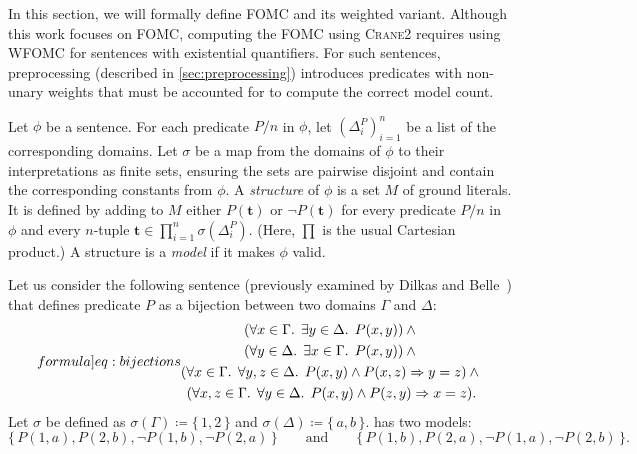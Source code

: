 \documentclass[a4paper,UKenglish,cleveref,autoref,table]{lipics-v2021}
\newcommand{\Cranetwo}{\textsc{Crane2}}
\begin{document}
In this section, we will formally define FOMC and its weighted variant. Although
this work focuses on FOMC, computing the FOMC using \Cranetwo{} requires using
WFOMC for sentences with existential quantifiers. For such sentences,
preprocessing (described in \cref{sec:preprocessing}) introduces predicates with
non-unary weights that must be accounted for to compute the correct model count.

\begin{definition}\label{def:model}
  Let $\phi$ be a sentence. For each predicate $P/n$ in $\phi$, let
  ${(\Delta_{i}^{P})}_{i=1}^{n}$ be a list of the corresponding domains. Let
  $\sigma$ be a map from the domains of $\phi$ to their interpretations as
  finite sets, ensuring the sets are pairwise disjoint and contain the
  corresponding constants from $\phi$. A \emph{structure} of $\phi$ is a set $M$
  of ground literals. It is defined by adding to $M$ either $P(\mathbf{t})$ or
  $\neg P(\mathbf{t})$ for every predicate $P/n$ in $\phi$ and every $n$-tuple
  $\mathbf{t} \in \prod_{i=1}^{n} \sigma(\Delta_{i}^{P})$. (Here, $\prod$ is the
  usual Cartesian product.) A structure is a \emph{model} if it makes $\phi$
  valid.
\end{definition}

\begin{example}\label{example:bijections}
  Let us consider the following sentence (previously examined by Dilkas and
  Belle~\cite{DBLP:conf/kr/DilkasB23}) that defines predicate $P$ as a bijection
  between two domains $\Gamma$ and $\Delta$:
  \begin{equation}\label[formula]{eq:bijections}
    \begin{gathered}
      (\forall x \in \Gamma\text{. }\exists y \in \Delta\text{. }P(x, y))\land{}\\
      (\forall y \in \Delta\text{. }\exists x \in \Gamma\text{. }P(x, y))\land{}\\
      (\forall x \in \Gamma\text{. }\forall y, z \in \Delta\text{. }P(x, y) \land P(x, z) \Rightarrow y = z)\land{}\\
      (\forall x, z \in \Gamma\text{. }\forall y \in \Delta\text{. }P(x, y) \land P(z, y) \Rightarrow x = z).
    \end{gathered}
  \end{equation}
  Let $\sigma$ be defined as $\sigma(\Gamma) \coloneqq \{\, 1, 2\,\}$ and
  $\sigma(\Delta) \coloneqq \{\,a, b\,\}$.  has two models:
  \[
    \{\, P(1, a), P(2, b), \neg P(1, b), \neg P(2, a) \,\} \qquad \text{and} \qquad \{\, P(1, b), P(2, a), \neg P(1, a), \neg P(2, b) \,\}.
  \]
\end{example}
\end{document}
